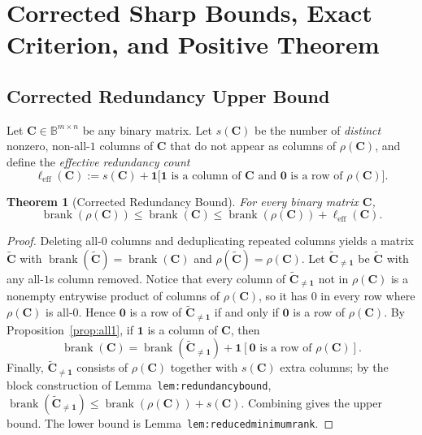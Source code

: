 \documentclass[11pt]{article}
\theoremstyle{plain}
\newtheorem{theorem}{Theorem}[section]
\theoremstyle{definition}
\theoremstyle{remark}
\DeclareMathOperator{\brank}{brank}
\begin{document}
\section{Corrected Sharp Bounds, Exact Criterion, and Positive Theorem}

\subsection{Corrected Redundancy Upper Bound}

Let $\mathbf{C} \in \mathbb{B}^{m \times n}$ be any binary matrix. Let $s(\mathbf{C})$ be the number of \emph{distinct} nonzero, non-all-$1$ columns of $\mathbf{C}$ that do not appear as columns of $\rho(\mathbf{C})$, and define the \emph{effective redundancy count}
\[
\ell_{\mathrm{eff}}(\mathbf{C}) := s(\mathbf{C}) + \mathbf{1}\bigl[\mathbf{1} \text{ is a column of } \mathbf{C} \text{ and } \mathbf{0} \text{ is a row of } \rho(\mathbf{C})\bigr].
\]

\begin{theorem}[Corrected Redundancy Bound]\label{thm:corrected}
For every binary matrix $\mathbf{C}$,
\[
\brank(\rho(\mathbf{C})) \le \brank(\mathbf{C}) \le \brank(\rho(\mathbf{C})) + \ell_{\mathrm{eff}}(\mathbf{C}).
\]
\end{theorem}

\begin{proof}
Deleting all-$0$ columns and deduplicating repeated columns yields a matrix $\tilde{\mathbf{C}}$ with $\brank(\tilde{\mathbf{C}}) = \brank(\mathbf{C})$ and $\rho(\tilde{\mathbf{C}}) = \rho(\mathbf{C})$. Let $\tilde{\mathbf{C}}_{\neq \mathbf{1}}$ be $\tilde{\mathbf{C}}$ with any all-$1$s column removed. Notice that every column of $\tilde{\mathbf{C}}_{\neq \mathbf{1}}$ not in $\rho(\mathbf{C})$ is a nonempty entrywise product of columns of $\rho(\mathbf{C})$, so it has $0$ in every row where $\rho(\mathbf{C})$ is all-$0$. Hence $\mathbf{0}$ is a row of $\tilde{\mathbf{C}}_{\neq \mathbf{1}}$ if and only if $\mathbf{0}$ is a row of $\rho(\mathbf{C})$. By Proposition~\ref{prop:all1}, if $\mathbf{1}$ is a column of $\mathbf{C}$, then
\[
\brank(\mathbf{C}) = \brank(\tilde{\mathbf{C}}_{\neq \mathbf{1}}) + \mathbf{1}[\mathbf{0} \text{ is a row of } \rho(\mathbf{C})].
\]
Finally, $\tilde{\mathbf{C}}_{\neq \mathbf{1}}$ consists of $\rho(\mathbf{C})$ together with $s(\mathbf{C})$ extra columns; by the block construction of Lemma~\texttt{lem:redundancybound}, $\brank(\tilde{\mathbf{C}}_{\neq \mathbf{1}}) \le \brank(\rho(\mathbf{C})) + s(\mathbf{C})$. Combining gives the upper bound. The lower bound is Lemma~\texttt{lem:reducedminimumrank}.
\end{proof}
\end{document}
